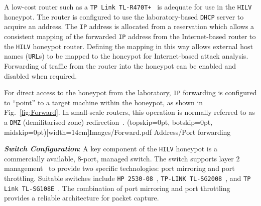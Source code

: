 \documentclass{ieeeaccess}
\begin{document}
A low-cost router such as a \texttt{TP Link TL-R470T+}~\cite{TPLINKR470:18} is
adequate for use in the \texttt{HILV} honeypot. The router is configured to use
the laboratory-based \texttt{DHCP} server to acquire an  address. The
\texttt{IP} address is allocated from a reservation which allows a consistent
mapping of the forwarded \texttt{IP} address from the Internet-based router to
the \texttt{HILV} honeypot router. Defining the mapping in this way allows
external host names (\texttt{URL}s) to be mapped to the honeypot for
Internet-based attack analysis. Forwarding of traffic from the router into the
honeypot can be enabled and disabled when required.

For direct access to the honeypot from the laboratory, \texttt{IP} forwarding is
configured to  ``point'' to a target machine within the honeypot,
as shown in Fig.~\ref{fig:Forward}. In small-scale routers, this operation is
normally referred to as a \texttt{DMZ} (demilitarised zone) redirection~\cite{MB:01}.
\newline
\Figure[t!](topskip=0pt, botskip=0pt, midskip=0pt)[width=14cm]{Images/Forward.pdf}
{Address/Port forwarding\label{fig:Forward}}


\noindent\textit{\textbf{Switch Configuration}}:
A key component of the \texttt{HILV} honeypot is a commercially available,
8-port, managed switch. The switch supports layer 2 management~\cite{ST:98} to
provide two specific technologies: port mirroring and port throttling. Suitable
switches include \texttt{HP 2530-08}~\cite{HP:17}, \texttt{TP-LINK
TL-SG2008}~\cite{TP:17}, and \texttt{TP Link TL-SG108E}~\cite{TPSG108E:18}.  The
combination of port mirroring and port throttling provides a reliable
architecture for packet capture.  \newline
\end{document}
